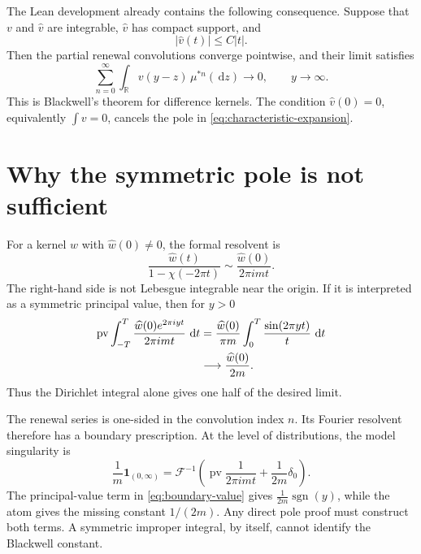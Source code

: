 \documentclass[10pt,reqno,a4paper]{amsart}
\numberwithin{equation}{section}
\theoremstyle{plain}
\theoremstyle{definition}
\theoremstyle{remark}
\newcommand{\R}{\mathbb{R}}
\newcommand{\1}{\mathbf{1}}
\newcommand{\de}{\,\mathrm{d}}
\newcommand{\abs}[1]{\left|#1\right|}
\newcommand{\Fourier}{\mathcal{F}}
\newcommand{\PV}{\operatorname{pv}}
\begin{document}
The Lean development already contains the following consequence.  Suppose
that \(v\) and \(\widehat v\) are integrable, \(\widehat v\) has compact
support, and
\begin{equation}\label{eq:difference-kernel}
  \abs{\widehat v(t)}\leq C\abs t.
\end{equation}
Then the partial renewal convolutions converge pointwise, and their limit
satisfies
\begin{equation}\label{eq:difference-kernel-limit}
  \sum_{n=0}^{\infty}\int_\R v(y-z)\,\mu^{*n}(\de z)
  \longrightarrow 0,
  \qquad y\to\infty.
\end{equation}
This is Blackwell's theorem for difference kernels.  The condition
\(\widehat v(0)=0\), equivalently \(\int v=0\), cancels the pole in
\cref{eq:characteristic-expansion}.

\section{Why the symmetric pole is not sufficient}\label{sec:principal-value}

For a kernel \(w\) with \(\widehat w(0)\neq0\), the formal resolvent is
\begin{equation}\label{eq:formal-resolvent}
  \frac{\widehat w(t)}{1-\chi(-2\pi t)}
  \sim
  \frac{\widehat w(0)}{2\pi i mt}.
\end{equation}
The right-hand side is not Lebesgue integrable near the origin.  If it is
interpreted as a symmetric principal value, then for \(y>0\)
\begin{align}
  \PV\int_{-T}^{T}
  \frac{\widehat w(0)e^{2\pi iyt}}{2\pi i mt}\,\de t
  &=
  \frac{\widehat w(0)}{\pi m}
  \int_0^T\frac{\sin(2\pi yt)}{t}\,\de t \notag\\
  &\longrightarrow
  \frac{\widehat w(0)}{2m}.
  \label{eq:half-constant}
\end{align}
Thus the Dirichlet integral alone gives one half of the desired limit.

The renewal series is one-sided in the convolution index \(n\).  Its Fourier
resolvent therefore has a boundary prescription.  At the level of
distributions, the model singularity is
\begin{equation}\label{eq:boundary-value}
  \frac{1}{m}\1_{(0,\infty)}
  =
  \Fourier^{-1}
  \left(
    \PV\frac{1}{2\pi i mt}
    +
    \frac{1}{2m}\delta_0
  \right).
\end{equation}
The principal-value term in \cref{eq:boundary-value} gives
\(\frac{1}{2m}\operatorname{sgn}(y)\), while the atom gives the missing
constant \(1/(2m)\).  Any direct pole proof must construct both terms.  A
symmetric improper integral, by itself, cannot identify the Blackwell
constant.
\end{document}
